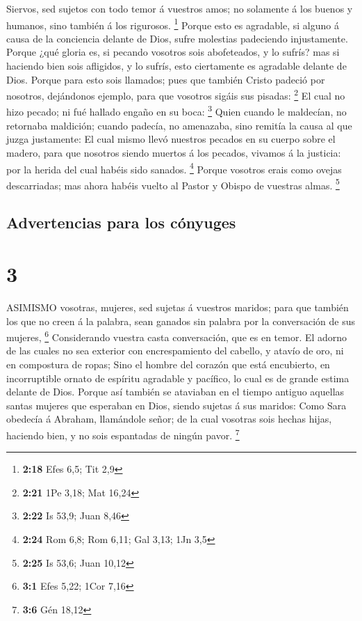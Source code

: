  Siervos, sed sujetos con todo temor á vuestros amos; no
solamente á los buenos y humanos, sino también á los rigurosos.
\footnote{\textbf{2:18} Efes 6,5; Tit 2,9}  Porque esto es
agradable, si alguno á causa de la conciencia delante de Dios, sufre
molestias padeciendo injustamente.  Porque ¿qué gloria es,
si pecando vosotros sois abofeteados, y lo sufrís? mas si haciendo bien
sois afligidos, y lo sufrís, esto ciertamente es agradable delante de
Dios.  Porque para esto sois llamados; pues que también
Cristo padeció por nosotros, dejándonos ejemplo, para que vosotros
sigáis sus pisadas: \footnote{\textbf{2:21} 1Pe 3,18; Mat 16,24}
 El cual no hizo pecado; ni fué hallado engaño en su boca:
\footnote{\textbf{2:22} Is 53,9; Juan 8,46}  Quien cuando
le maldecían, no retornaba maldición; cuando padecía, no amenazaba, sino
remitía la causa al que juzga justamente:  El cual mismo
llevó nuestros pecados en su cuerpo sobre el madero, para que nosotros
siendo muertos á los pecados, vivamos á la justicia: por la herida del
cual habéis sido sanados. \footnote{\textbf{2:24} Rom 6,8; Rom 6,11; Gal
  3,13; 1Jn 3,5}  Porque vosotros erais como ovejas
descarriadas; mas ahora habéis vuelto al Pastor y Obispo de vuestras
almas. \footnote{\textbf{2:25} Is 53,6; Juan 10,12}

\hypertarget{advertencias-para-los-cuxf3nyuges}{%
\subsection{Advertencias para los
cónyuges}\label{advertencias-para-los-cuxf3nyuges}}

\hypertarget{section-2}{%
\section{3}\label{section-2}}

 ASIMISMO vosotras, mujeres, sed sujetas á vuestros maridos;
para que también los que no creen á la palabra, sean ganados sin palabra
por la conversación de sus mujeres, \footnote{\textbf{3:1} Efes 5,22;
  1Cor 7,16}  Considerando vuestra casta conversación, que
es en temor.  El adorno de las cuales no sea exterior con
encrespamiento del cabello, y atavío de oro, ni en compostura de ropas;
 Sino el hombre del corazón que está encubierto, en
incorruptible ornato de espíritu agradable y pacífico, lo cual es de
grande estima delante de Dios.  Porque así también se
ataviaban en el tiempo antiguo aquellas santas mujeres que esperaban en
Dios, siendo sujetas á sus maridos:  Como Sara obedecía á
Abraham, llamándole señor; de la cual vosotras sois hechas hijas,
haciendo bien, y no sois espantadas de ningún pavor. \footnote{\textbf{3:6}
  Gén 18,12}

